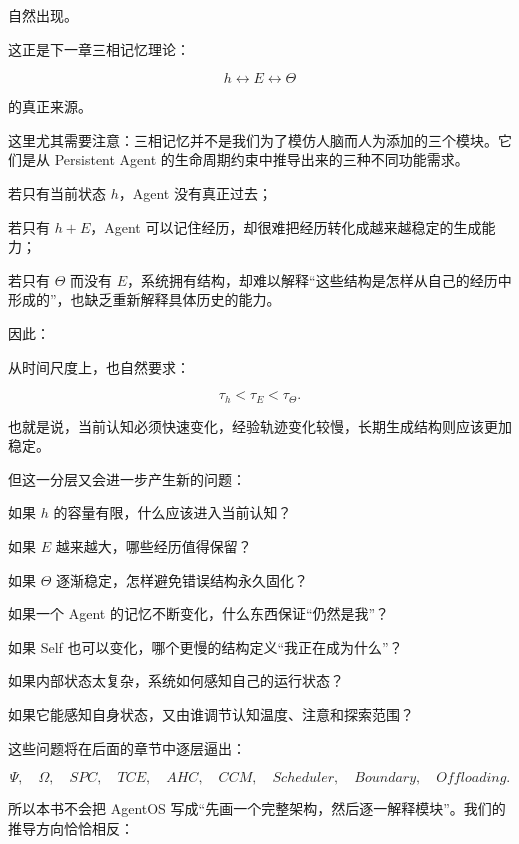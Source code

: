 自然出现。

这正是下一章三相记忆理论：

\[
\boxed{
h
\leftrightarrow
E
\leftrightarrow
\Theta
}
\]

的真正来源。

这里尤其需要注意：三相记忆并不是我们为了模仿人脑而人为添加的三个模块。它们是从 Persistent Agent 的生命周期约束中推导出来的三种不同功能需求。

若只有当前状态 $h$，Agent 没有真正过去；

若只有 $h+E$，Agent 可以记住经历，却很难把经历转化成越来越稳定的生成能力；

若只有 $\Theta$ 而没有 $E$，系统拥有结构，却难以解释“这些结构是怎样从自己的经历中形成的”，也缺乏重新解释具体历史的能力。

因此：

\begin{statementbox}
\centering
{}
\end{statementbox}

从时间尺度上，也自然要求：

\[
\tau_h
<
\tau_E
<
\tau_\Theta.
\]

也就是说，当前认知必须快速变化，经验轨迹变化较慢，长期生成结构则应该更加稳定。

但这一分层又会进一步产生新的问题：

如果 $h$ 的容量有限，什么应该进入当前认知？

如果 $E$ 越来越大，哪些经历值得保留？

如果 $\Theta$ 逐渐稳定，怎样避免错误结构永久固化？

如果一个 Agent 的记忆不断变化，什么东西保证“仍然是我”？

如果 Self 也可以变化，哪个更慢的结构定义“我正在成为什么”？

如果内部状态太复杂，系统如何感知自己的运行状态？

如果它能感知自身状态，又由谁调节认知温度、注意和探索范围？

这些问题将在后面的章节中逐层逼出：

\[
\Psi,\quad
\Omega,\quad
SPC,\quad
TCE,\quad
AHC,\quad
CCM,\quad
Scheduler,\quad
Boundary,\quad
Offloading.
\]

所以本书不会把 AgentOS 写成“先画一个完整架构，然后逐一解释模块”。我们的推导方向恰恰相反：

\begin{statementbox}
\centering
{}
\end{statementbox}

